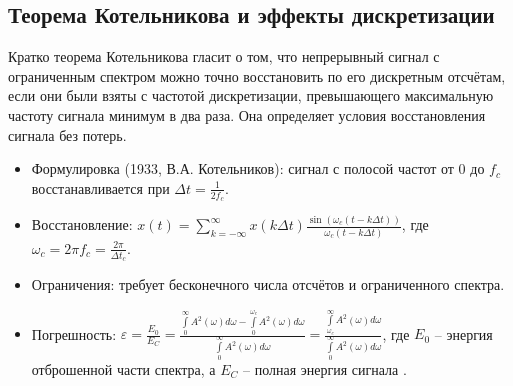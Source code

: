 	\subsection{Теорема Котельникова и эффекты дискретизации}
	Кратко теорема Котельникова гласит о том, что непрерывный сигнал с ограниченным спектром можно точно восстановить по его дискретным отсчётам, если они были взяты с частотой дискретизации, превышающего максимальную частоту сигнала минимум в два раза. 
	\newline
	Она определяет условия восстановления сигнала без потерь.
	\vspace{-0.5em}
	\begin{itemize}
		\item Формулировка (1933, В.А. Котельников): сигнал с полосой частот от $0$ до $f_c$ восстанавливается при $\Delta t = \frac{1}{2f_c}$.
		\vspace{-0.75em}
		\item Восстановление: $x(t) = \sum\limits_{k=-\infty}^{\infty} x(k\Delta t) \frac{\sin(\omega_c (t - k\Delta t))}{\omega_c (t - k\Delta t)}$, где $\omega_c = 2\pi f_c = \frac{2\pi}{\Delta t_c}$.
		\vspace{-0.5em}
		\item Ограничения: требует бесконечного числа отсчётов и ограниченного спектра.
		\vspace{-0.5em}
		\item Погрешность: $\varepsilon = \frac{E_0}{E_C} = \frac{\int\limits_{0}^{\infty} A^2(\omega) d\omega - \int\limits_{0}^{\omega_c} A^2(\omega) d\omega}{\int\limits_0^{\infty} A^2(\omega) d\omega} = \frac{\int\limits_{\omega_c}^{\infty} A^2(\omega) d\omega}{\int\limits_0^{\infty} A^2(\omega) d\omega}$, 
		\newline
		где $E_0$ -- энергия отброшенной части спектра, а $E_C$ -- полная энергия сигнала .
	\end{itemize}
	
